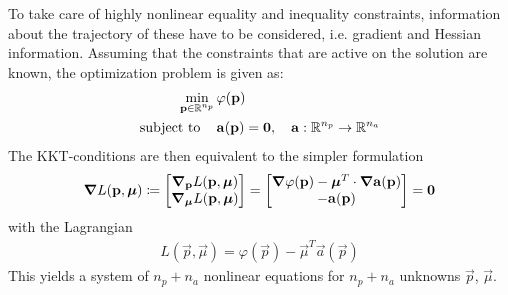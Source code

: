 		To take care of highly nonlinear equality and inequality constraints, information about the trajectory of these have to be considered, i.e. gradient and Hessian information. Assuming that the constraints that are active on the solution are known, the optimization problem is given as:
		\begin{align*}
			\min_{\boldsymbol{\mathrm{p}} \in \mathbb{R}^{n_p}} &\, \varphi(\boldsymbol{\mathrm{p}}) \\
			\mathrm{subject~to}\quad &\, \boldsymbol{\mathrm{a}}(\boldsymbol{\mathrm{p}}) = \boldsymbol{\mathrm{0}},\quad \boldsymbol{\mathrm{a}} : \mathbb{R}^{n_p} \to \mathbb{R}^{n_a}
		\end{align*}
		The KKT-conditions are then equivalent to the simpler formulation
		\begin{align*}
			\grad{L}(\boldsymbol{\mathrm{p}}, \boldsymbol{\mathrm{\mu}}) \coloneqq
				\begin{bmatrix}
					\grad_{\boldsymbol{\mathrm{p}}}L(\boldsymbol{\mathrm{p}}, \boldsymbol{\mathrm{\mu}}) \\
					\grad_{\boldsymbol{\mathrm{\mu}}}L(\boldsymbol{\mathrm{p}}, \boldsymbol{\mathrm{\mu}})
				\end{bmatrix}
			=
				\begin{bmatrix}
					\grad{\varphi}(\boldsymbol{\mathrm{p}}) - \boldsymbol{\mathrm{\mu}}^T \cdot \grad{\boldsymbol{\mathrm{a}}}(\boldsymbol{\mathrm{p}}) \\
					-\boldsymbol{\mathrm{a}}(\boldsymbol{\mathrm{p}})
				\end{bmatrix}
			= \boldsymbol{\mathrm{0}}
		\end{align*}
		with the Lagrangian
		\begin{align*}
			L(\vec{p}, \vec{\mu}) = \varphi(\vec{p}) - \vec{\mu}^T \vec{a}(\vec{p})
		\end{align*}
		This yields a system of \( n_p + n_a \) nonlinear equations for \( n_p + n_a \) unknowns \( \vec{p} \), \( \vec{\mu} \).
		
